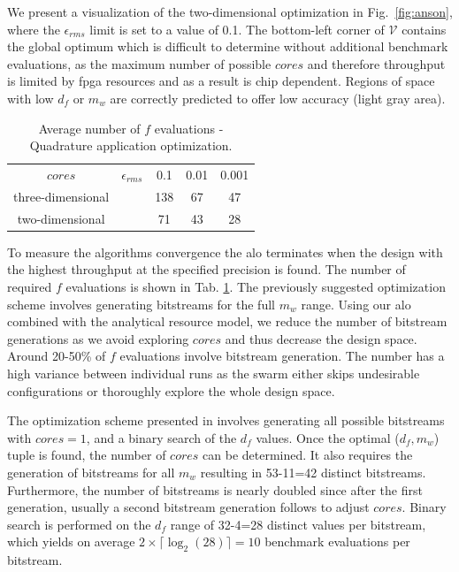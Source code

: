 \documentclass[runningheads,a4paper]{llncs}
\begin{document}
 We present a visualization of the two-dimensional optimization in Fig.~\ref{fig:anson}, where the $\epsilon_{rms}$ limit is set to a value of 0.1. The bottom-left corner of $\mathcal{V}$ contains the global optimum which is difficult to determine without additional benchmark evaluations, as the maximum number of possible $cores$ and therefore throughput is limited by \ac{fpga} resources and as a result is chip dependent. Regions of space with low $d_f$ or $m_w$ are correctly predicted to offer low accuracy (light gray area). 
 
\begin{table}
  \caption {Average number of $f$ evaluations - Quadrature application optimization.}  
  \label{tab:anson}
    \begin{center} 
\begin{tabular}{c|cccc} 
\toprule 
	 $cores$  & $\epsilon_{rms}$ & 0.1 & 0.01 & 0.001 \\\cline{2-5}  
	  three-dimensional &  & 138 & 67 & 47 \\ 
       two-dimensional & & 71 & 43 & 28 \\
\bottomrule 
\end{tabular} 
\end{center}
\end{table}


To measure the algorithms convergence the \ac{alo} terminates when the design with the highest throughput at the specified precision is found. The number of required $f$ evaluations is shown in Tab. \ref{tab:anson}. The previously suggested optimization scheme \cite{Anson2012Quad} involves generating bitstreams for the full $m_w$ range. Using our \ac{alo} combined with the analytical resource model, we reduce the number of bitstream generations as we avoid exploring $cores$ and thus decrease the design space. Around 20-50\% of $f$ evaluations involve bitstream generation. The number has a high variance between individual runs as the swarm either skips undesirable configurations or thoroughly explore the whole design space.

The optimization scheme presented in \cite{Anson2012Quad} involves generating all possible bitstreams with $cores=1$, and a binary search of the $d_f$ values. Once the optimal ($d_f,m_w$) tuple is found, the number of $cores$ can be determined. It also requires the generation of bitstreams for all $m_w$ resulting in 53-11=42 distinct bitstreams. Furthermore, the number of bitstreams is nearly doubled since after the first generation, usually a second bitstream generation follows to adjust $cores$. Binary search is performed on the $d_f$ range of 32-4=28 distinct values per bitstream, which yields on average $2 \times \lceil\log_2 \left( 28 \right)\rceil= 10$ benchmark evaluations per bitstream.
\end{document}
